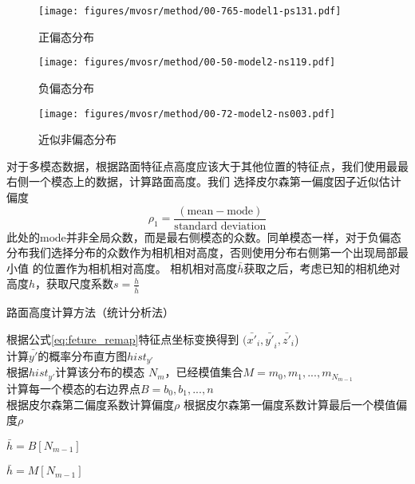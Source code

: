 \begin{figure}[h]
    \texttt{[image: figures/mvosr/method/00-765-model1-ps131.pdf]}
    \caption{正偏态分布}
    \label{fig:mvosr_wrong_skewness}
\end{figure}
\begin{figure}[h]
    \texttt{[image: figures/mvosr/method/00-50-model2-ns119.pdf]}

    \caption{负偏态分布}
    \label{fig:negative_skewness}
\end{figure}
\begin{figure}[h]
    \texttt{[image: figures/mvosr/method/00-72-model2-ns003.pdf]}

    \caption{近似非偏态分布}
    \label{fig:no_skewness}
\end{figure}
对于多模态数据，根据路面特征点高度应该大于其他位置的特征点，我们使用最最右侧一个模态上的数据，计算路面高度。我们
选择皮尔森第一偏度因子近似估计偏度
\begin{equation}
    \rho_1 = \frac{(\text{mean}-\text{mode})}{\text{standard deviation}}
\end{equation}
此处的$\text{mode}$并非全局众数，而是最右侧模态的众数。同单模态一样，对于负偏态分布我们选择分布的众数作为相机相对高度，否则使用分布右侧第一个出现局部最小值
的位置作为相机相对高度。
相机相对高度$\bar{h}$获取之后，考虑已知的相机绝对高度$h$，获取尺度系数$s=\frac{h}{\bar{h}}$

\begin{algorithm}
    \caption{路面高度计算方法（统计分析法）}
    根据公式\ref{eq:feture_remap}特征点坐标变换得到 $(\bar{x'}_i,\bar{y'}_i,\bar{z'}_i$)\\
    计算$\bar{y'}$的概率分布直方图$hist_{y'}$\\
    根据$hist_{y'}$计算该分布的模态 $N_m$，已经模值集合$M={m_0,m_1,...,m_{N_{m-1}}}$\\
    计算每一个模态的右边界点$B={b_0,b_1,...,n}$\\
    {
        根据皮尔森第二偏度系数计算偏度$\rho$
    }
    {
        根据皮尔森第一偏度系数计算最后一个模值偏度$\rho$
    }
    
    {
        $\bar{h} = B[N_{m-1}]$

    }
    {
        $\bar{h} = M[N_{m-1}]$
    }
  \label{alg:road_height_calculation}
\end{algorithm}

